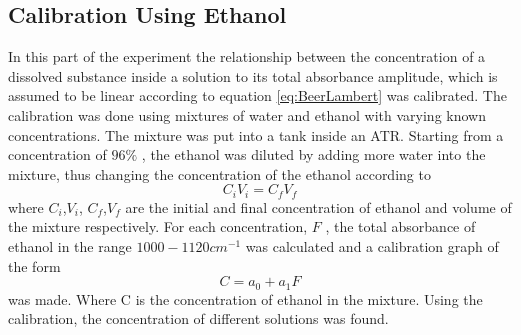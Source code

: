 \documentclass[reprint,amsmath,amssymb,aps, prl]{revtex4-2}
\begin{document}
\subsection{Calibration Using Ethanol} 
In this part of the experiment the relationship between the concentration of a dissolved substance inside a solution
to its total absorbance amplitude, which is assumed to be linear according to equation \ref{eq:BeerLambert} was calibrated. The calibration was done using mixtures of water and ethanol  with varying known concentrations. The mixture was put into a tank inside an ATR. Starting from a concentration of $96\%$ , the ethanol was diluted by adding more water into the mixture, thus changing the concentration of the ethanol according to 
\begin{equation} \label{eq:EthanolConcentrVolume}
C_{i}V_{i} = C_{f}V_{f}
\end{equation}
where $C_{i}$,$V_{i}$, $C_{f}$,$V_{f}$ are the initial and final concentration of ethanol and volume of the mixture respectively. 
For each concentration, $F$ , the total absorbance of ethanol in the range $1000-1120 cm^{-1}$ was calculated and a calibration graph of the form 
\begin{equation} \label{eq:EthanolLinFit}
    C=a_{0}+a_{1}F 
\end{equation} 
was made. Where C is the concentration of ethanol in the mixture. Using the calibration, the concentration of different solutions was found. 
\end{document}
